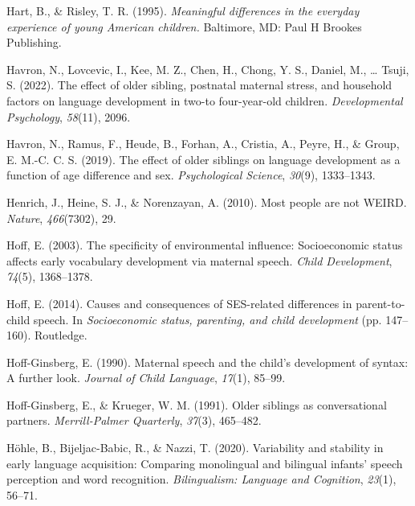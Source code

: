 \documentclass[
  man,floatsintext]{apa6}
\newlength{\cslhangindent}
\newlength{\cslentryspacingunit} %
\newenvironment{CSLReferences}[2] %
 {%
  \setlength{\parindent}{0pt}
  \ifodd #1
  \let\oldpar\par
  \def\par{\hangindent=\cslhangindent\oldpar}
  \fi
  \setlength{\parskip}{#2\cslentryspacingunit}
 }%
 {}
\begin{document}
\begin{CSLReferences}{1}{0}
\leavevmode{}%
Hart, B., \& Risley, T. R. (1995). \emph{Meaningful differences in the everyday experience of young {A}merican children.} Baltimore, MD: Paul H Brookes Publishing.

\leavevmode{}%
Havron, N., Lovcevic, I., Kee, M. Z., Chen, H., Chong, Y. S., Daniel, M., \ldots{} Tsuji, S. (2022). The effect of older sibling, postnatal maternal stress, and household factors on language development in two-to four-year-old children. \emph{Developmental Psychology}, \emph{58}(11), 2096.

\leavevmode{}%
Havron, N., Ramus, F., Heude, B., Forhan, A., Cristia, A., Peyre, H., \& Group, E. M.-C. C. S. (2019). The effect of older siblings on language development as a function of age difference and sex. \emph{Psychological Science}, \emph{30}(9), 1333--1343.

\leavevmode{}%
Henrich, J., Heine, S. J., \& Norenzayan, A. (2010). Most people are not WEIRD. \emph{Nature}, \emph{466}(7302), 29.

\leavevmode{}%
Hoff, E. (2003). The specificity of environmental influence: Socioeconomic status affects early vocabulary development via maternal speech. \emph{Child Development}, \emph{74}(5), 1368--1378.

\leavevmode{}%
Hoff, E. (2014). Causes and consequences of SES-related differences in parent-to-child speech. In \emph{Socioeconomic status, parenting, and child development} (pp. 147--160). Routledge.

\leavevmode{}%
Hoff-Ginsberg, E. (1990). Maternal speech and the child's development of syntax: A further look. \emph{Journal of Child Language}, \emph{17}(1), 85--99.

\leavevmode{}%
Hoff-Ginsberg, E., \& Krueger, W. M. (1991). Older siblings as conversational partners. \emph{Merrill-Palmer Quarterly}, \emph{37}(3), 465--482.

\leavevmode{}%
Höhle, B., Bijeljac-Babic, R., \& Nazzi, T. (2020). Variability and stability in early language acquisition: Comparing monolingual and bilingual infants' speech perception and word recognition. \emph{Bilingualism: Language and Cognition}, \emph{23}(1), 56--71.


\end{CSLReferences}
\end{document}
